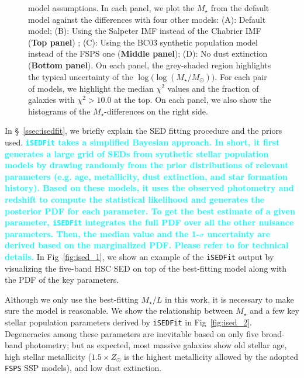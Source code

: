 \documentclass[fleqn,usenatbib]{mnras}
\def\mstar{{$M_{\star}$}}
\def\logms{{$\log (M_{\star}/M_{\odot})$}}
\def\m2l{{$M_{\star}/L$}}
\newcommand{\song}[1]{\textcolor{cyan}{\textbf{#1}}}
\begin{document}
\begin{figure}
\begin{center}
{            model assumptions. 
            In each panel, we plot the \mstar{} from the default model against the
            differences with four other models:
            (A): Default model; 
            (B): Using the Salpeter IMF instead of the Chabrier IMF 
                (\textbf{Top panel}) ;
            (C): Using the BC03 synthetic population model instead of the FSPS one
                (\textbf{Middle panel});
            (D): No dust extinction (\textbf{Bottom panel}). 
            On each panel, the grey-shaded region highlights the typical uncertainty 
            of the $\log($\logms{}$)$.            
            For each pair of models, we highlight the median $\chi^{2}$ values and 
            the fraction of galaxies with $\chi^{2} > 10.0$ at the top. 
            On each panel, we also show the histograms of the \mstar{}-differences on 
            the right side.
            }
        \label{fig:ised_3}
        \end{center}
    \end{figure}

 
    In \S~\ref{ssec:isedfit}, we briefly explain the SED fitting procedure and 
    the priors used.   
    \song{
    \texttt{iSEDFit} takes a simplified Bayesian approach. 
    In short, it first generates a large grid of SEDs from synthetic stellar 
    population models by drawing randomly from the prior distributions of relevant
    parameters (e.g. age, metallicity, dust extinction, and star formation history).
    Based on these models, it uses the observed photometry and redshift to compute 
    the statistical likelihood and generates the posterior PDF for each parameter.  
    To get the best estimate of a given parameter, \texttt{iSEDFit} integrates the 
    full PDF over all the other nuisance parameters.
    Then, the median value and the 1-$\sigma$ uncertainty are derived based on the 
    marginalized PDF. 
    Please refer to \citet{Moustakas13} for technical details. 
    }
    In Fig~\ref{fig:ised_1}, we show an example of the \texttt{iSEDFit} output by 
    visualizing the five-band HSC SED on top of the best-fitting model along with the PDF 
    of the key parameters.
     
    Although we only use the best-fitting \m2l{} in this work, it is necessary to make 
    sure the model is reasonable. 
    We show the relationship between \mstar{} and a few key stellar population parameters 
    derived by \texttt{iSEDFit} in Fig~\ref{fig:ised_2}. 
    Degeneracies among these parameters are inevitable based on only five broad-band
    photometry; but as expected, most massive galaxies show old stellar age, high
    stellar metallicity ($1.5 \times Z_{\odot}$ is the highest metallicity allowed by 
    the adopted \texttt{FSPS} SSP models), and low dust extinction.
   
\end{document}
